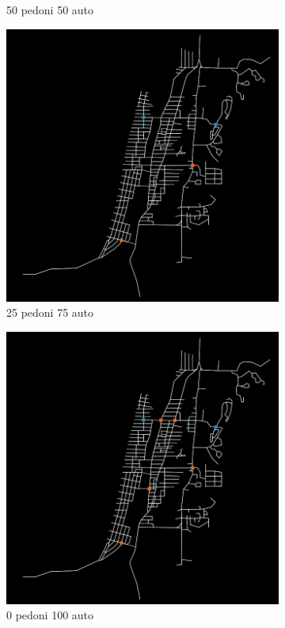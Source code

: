 \begin{figure}[ht]
\begin{subfigure}{0.475\textwidth}
        \caption{50 pedoni 50 auto}
    \end{subfigure}
    \begin{subfigure}{0.475\textwidth}
        \centering
        \includegraphics[width=\textwidth]{images/analisi/comparison-new-in-out-flow-25-75-car.png}
        \caption{25 pedoni 75 auto}
    \end{subfigure}
    \begin{subfigure}{0.475\textwidth}
        \centering
        \includegraphics[width=\textwidth]{images/analisi/comparison-new-in-out-flow-0-100-car.png}
        \caption{0 pedoni 100 auto}
    \end{subfigure}
    \caption{}
    \label{fig:analisi-comparison-in-out-flow-map-new}
\end{figure}

